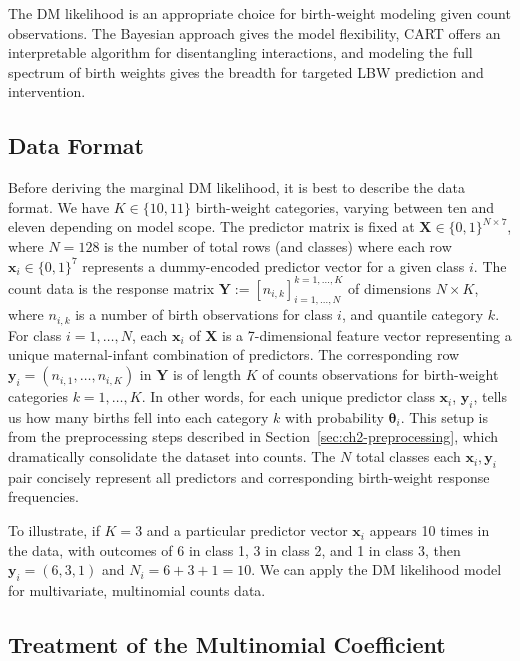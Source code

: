 The DM likelihood is an appropriate choice for birth-weight modeling given count observations. The Bayesian approach gives the model flexibility, CART offers an interpretable algorithm for disentangling interactions, and modeling the full spectrum of birth weights gives the breadth for targeted LBW prediction and intervention.

\subsection{Data Format}
\label{sec:ch2-data-format}

Before deriving the marginal DM likelihood, it is best to describe the data format. We have \(K\in\{10,11\}\) birth-weight categories, varying between ten and eleven depending on model scope. The predictor matrix is fixed at \(\mathbf{X} \in \{0,1\}^{N \times 7}\), where \(N=128\) is the number of total rows (and classes) where each row \(\mathbf{x}_i \in \{0,1\}^7\) represents a dummy-encoded predictor vector for a given class \(i\). The count data is the response matrix \(\mathbf{Y} := [n_{i,k}]_{i=1,\dots,N}^{k = 1,\dots,K}\) of dimensions \(N \times K\), where \(n_{i,k}\) is a number of birth observations for class \(i\), and quantile category \(k\). For class \(i=1,\dots,N\), each \(\mathbf{x}_i\) of \(\mathbf{X}\) is a 7-dimensional feature vector representing a unique maternal-infant combination of predictors. The corresponding row \(\mathbf{y}_i =(n_{i,1}, \dots, n_{i,K}) \) in \(\mathbf{Y}\) is of length \(K\) of counts observations for birth-weight categories \(k = 1, \dots, K\). In other words, for each unique predictor class \(\mathbf{x}_i\), \(\mathbf{y}_i\), tells us how many births fell into each category \(k\) with probability \(\boldsymbol{\theta}_i\). This setup is from the preprocessing steps described in Section~\ref{sec:ch2-preprocessing}, which dramatically consolidate the dataset into counts. The \(N\) total classes each \(\mathbf{x}_i, \mathbf{y}_i\) pair concisely represent all predictors and corresponding birth-weight response frequencies. 

To illustrate, if \(K=3\) and a particular predictor vector \(\mathbf{x}_i\) appears 10 times in the data, with outcomes of 6 in class 1, 3 in class 2, and 1 in class 3, then \(\mathbf{y}_i = (6,3,1)\) and \(N_i = 6 + 3 + 1 = 10\). We can apply the DM likelihood model for multivariate, multinomial counts data.

\subsection{Treatment of the Multinomial Coefficient}
\label{sec:ch2-likelihood-adjustment}

